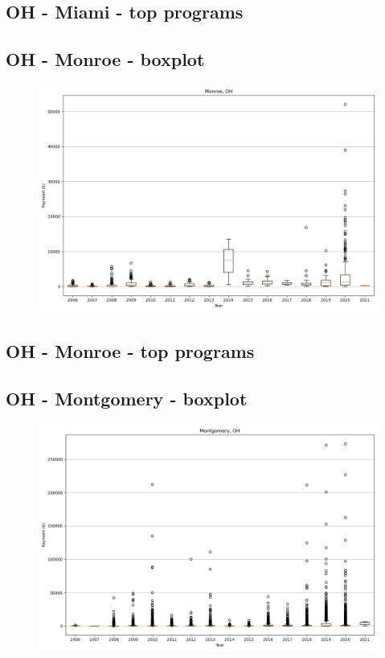 \subsection*{OH - Miami - top programs}

\newpage
\subsection*{OH - Monroe - boxplot}
\begin{figure}[h]
\centering
\includegraphics[width=7in]{../output/boxplots/counties/Monroe-OH_boxplot.png}
\end{figure}


\subsection*{OH - Monroe - top programs}

\newpage
\subsection*{OH - Montgomery - boxplot}
\begin{figure}[h]
\centering
\includegraphics[width=7in]{../output/boxplots/counties/Montgomery-OH_boxplot.png}
\end{figure}


